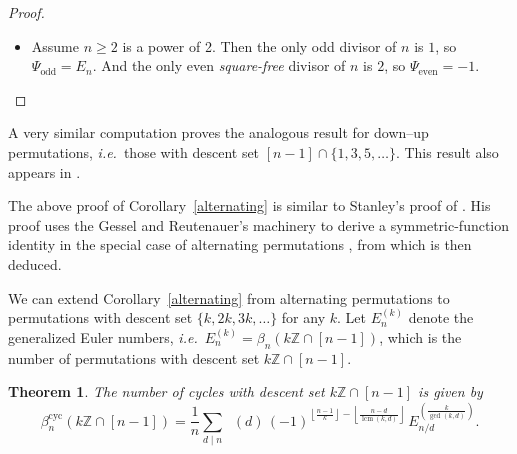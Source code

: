 \documentclass[12pt]{article}
\newcommand{\betacyc}{\beta^{\text{cyc}}}
\DeclareMathOperator{\mob}{M\ddot{o}b}
\DeclareMathOperator{\lcm}{lcm}
\newtheorem{thm}{Theorem}[section]
\theoremstyle{definition}
\begin{document}
\begin{proof}
\begin{itemize}
\item Assume $n \ge 2$ is a power of 2. Then the only odd divisor of $n$ is $1$, so $\Psi_\text{odd} = E_n$. And the only even \textit{square-free} divisor of $n$ is $2$, so $\Psi_\text{even} = -1$. \qedhere
\end{itemize}\end{proof}

A very similar computation proves the analogous result for down--up permutations, \textit{i.e.}\ those with descent set $[n-1] \cap \{1, 3, 5, \ldots\}$. This result also appears in \cite[Thm.\ 5.3]{StanleyAlt}.

The above proof of Corollary~\ref{alternating} is similar to Stanley's proof of \cite[Thm.\ 5.3]{StanleyAlt}. 
His proof uses the Gessel and Reutenauer's machinery  \cite[Thm.\ 2.1]{GR} to derive a symmetric-function identity in the special case of alternating permutations \cite[Thm.\ 2.3]{StanleyAlt}, from which \cite[Thm.\ 5.3]{StanleyAlt} is then deduced.


We can extend Corollary~\ref{alternating} from alternating permutations to permutations with descent set $\{k, 2k, 3k, \ldots\}$ for any $k$. Let $E_n^{(k)}$ denote the generalized Euler numbers, \textit{i.e.}\ $E_n^{(k)} = \beta_n(k\mathbb{Z} \cap [n-1])$, which is the number of permutations with descent set $k\mathbb{Z} \cap [n-1]$.

\begin{thm} \label{generalized}
The number of cycles with descent set $k\mathbb{Z} \cap [n-1]$ is given by
\[ \betacyc_n(k\mathbb{Z} \cap [n-1]) = \frac{1}{n}\sum_{\text{$d \mid n$}} \mob(d) \, (-1)^{\left\lfloor\frac{n-1}{k}\right\rfloor - \left\lfloor\frac{n-d}{\lcm(k,d)}\right\rfloor} \, E_{n/d}^{\left(\frac{k}{\gcd(k,d)}\right)}. \]
\end{thm}
\end{document}

